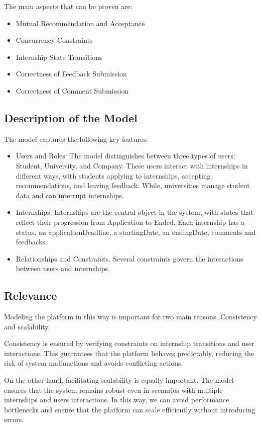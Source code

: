\documentclass[a4paper,12pt]{article}
\begin{document}
The main aspects that can be proven are:
\begin{itemize}
    \item Mutual Recommendation and Acceptance
    \item Concurrency Constraints
    \item Internship State Transitions
    \item Correctness of Feedback Submission
    \item Correctness of Comment Submission
\end{itemize}
\subsection{Description of the Model}
The model captures the following key features:
\begin{itemize}
    \item Users and Roles:
    The model distinguishes between three types of users: Student, University, and Company. These users interact with internships in different ways, with students applying to internships, accepting recommendations, and leaving feedback. While, universities manage student data and can interrupt internships.
    \item Internships:
    Internships are the central object in the system, with states that reflect their progression from Application to Ended. Each internship has a status, an applicationDeadline, a startingDate, an endingDate, comments and feedbacks.
    \item Relationships and Constraints.
    Several constraints govern the interactions between users and internships.
\end{itemize}
\subsection{Relevance}
Modeling the platform in this way is important for two main reasons. Consistency and scalability.

Consistency is ensured by verifying constraints on internship transitions and user interactions. This guarantees that the platform behaves predictably, reducing the risk of system malfunctions and avoids conflicting actions.

On the other hand, facilitating scalability is equally important. The model ensures that the system remains robust even in scenarios with multiple internships and users interactions. In this way, we can avoid performance bottlenecks and ensure that the platform can scale efficiently without introducing errors.
\end{document}

